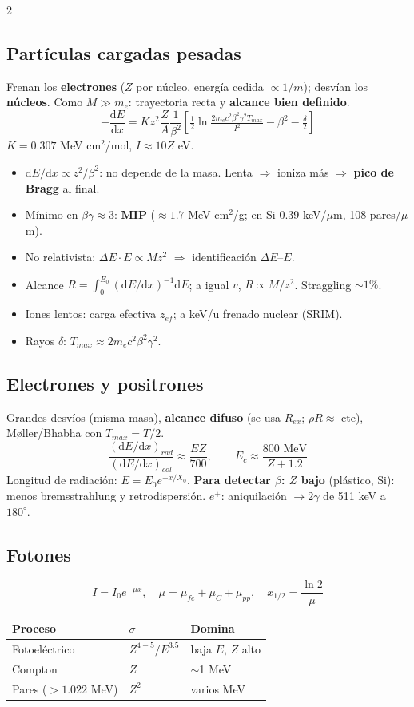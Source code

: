 \documentclass[10pt,a4paper]{article}
\newcommand{\imp}[1]{\textbf{\color{BrickRed}#1}}
\newcommand{\dEdx}{\ensuremath{\mathrm{d}E/\mathrm{d}x}}
\begin{document}
\begin{multicols}{2}
\subsection{Partículas cargadas pesadas}
Frenan los \textbf{electrones} ($Z$ por núcleo, energía cedida $\propto1/m$); desvían los \textbf{núcleos}. Como $M\gg m_e$: trayectoria recta y \textbf{alcance bien definido}.
\[ -\frac{\mathrm{d}E}{\mathrm{d}x}=Kz^2\frac{Z}{A}\frac{1}{\beta^2}\left[\tfrac12\ln\tfrac{2m_ec^2\beta^2\gamma^2T_{max}}{I^2}-\beta^2-\tfrac{\delta}{2}\right] \]
$K=0.307$ MeV cm$^2$/mol, $I\approx10Z$ eV.
\begin{itemize}
\item $\dEdx\propto z^2/\beta^2$: no depende de la masa. Lenta $\Rightarrow$ ioniza más $\Rightarrow$ \imp{pico de Bragg} al final.
\item Mínimo en $\beta\gamma\approx3$: \textbf{MIP} ($\approx1.7$ MeV cm$^2$/g; en Si 0.39 keV/$\mu$m, 108 pares/$\mu$m).
\item No relativista: $\Delta E\cdot E\propto Mz^2$ $\Rightarrow$ identificación $\Delta E$--$E$.
\item Alcance $R=\int_0^{E_0}(\dEdx)^{-1}\mathrm{d}E$; a igual $v$, $R\propto M/z^2$. Straggling $\sim1\%$.
\item Iones lentos: carga efectiva $z_{ef}$; a keV/u frenado nuclear (SRIM).
\item Rayos $\delta$: $T_{max}\approx2m_ec^2\beta^2\gamma^2$.
\end{itemize}
\subsection{Electrones y positrones}
Grandes desvíos (misma masa), \textbf{alcance difuso} (se usa $R_{ex}$; $\rho R\approx$ cte), Møller/Bhabha con $T_{max}=T/2$.
\[ \frac{(\dEdx)_{rad}}{(\dEdx)_{col}}\approx\frac{EZ}{700},\qquad E_c\approx\frac{800\text{ MeV}}{Z+1.2} \]
Longitud de radiación: $E=E_0e^{-x/X_0}$.
\imp{Para detectar $\beta$: $Z$ bajo} (plástico, Si): menos bremsstrahlung y retrodispersión. $e^+$: aniquilación $\to2\gamma$ de 511 keV a $180^\circ$.
\columnbreak
\subsection{Fotones}
\[ I=I_0e^{-\mu x},\quad \mu=\mu_{fe}+\mu_C+\mu_{pp},\quad x_{1/2}=\frac{\ln2}{\mu} \]
\begin{tabular}{@{}lll@{}}
\toprule
Proceso & $\sigma$ & Domina\\\midrule
Fotoeléctrico & $Z^{4-5}/E^{3.5}$ & baja $E$, $Z$ alto\\
Compton & $Z$ & $\sim$1 MeV\\
Pares ($>1.022$ MeV) & $Z^2$ & varios MeV\\\bottomrule
\end{tabular}


\end{multicols}
\end{document}
